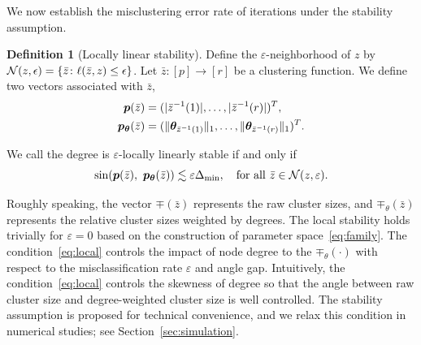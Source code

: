 \documentclass[journal]{IEEEtran}
\theoremstyle{definition}
\theoremstyle{definition}
\newtheorem{defn}{Definition}
\begin{document}
We now establish the misclustering error rate of iterations under the stability assumption. 
\begin{defn}[Locally linear stability] \label{def:stable}
Define the $\varepsilon$-neighborhood of $z$ by $\mathcal{N}(z,\epsilon)=\{\bar z\colon \ell(\bar z, z)\leq \epsilon\}$. Let $\bar z\colon[p]\to [r]$ be a clustering function. We define two vectors associated with $\bar z$,
\begin{align}
    \bm{p}(\bar z) & =(|\bar z^{-1}(1)|, \ldots,|\bar z^{-1}(r)|)^T, \\
    \bm{p}_{\boldsymbol{\theta}}(\bar z)&=(\lVert\boldsymbol{\theta}_{\bar z^{-1}(1)}\rVert_1,\ldots,\lVert\boldsymbol{\theta}_{\bar z^{-1}(r)}\rVert_1)^T.
\end{align}

We call the degree is $\varepsilon$-locally linearly stable if and only if 
\begin{equation}\label{eq:local}
    \sin(\mp(\bar z),\ \mp_{\mtheta}(\bar z))\lesssim \varepsilon \Delta_{\min} ,\quad \text{for all } \bar z\in \tN(z, \varepsilon).
\end{equation}
\end{defn}

Roughly speaking, the vector $\mp(\bar z)$ represents the raw cluster sizes, and $\mp_{\theta}(\bar z)$ represents the relative cluster sizes weighted by degrees. 
The local stability holds trivially for $\varepsilon=0$ based on the construction of parameter space~\eqref{eq:family}. The condition~\eqref{eq:local} controls the impact of node degree to the $\mp_{\theta}(\cdot)$ with respect to the misclassification rate $\varepsilon$ and angle gap.  Intuitively, the condition~\eqref{eq:local} controls the skewness of degree so that the angle between raw cluster size and degree-weighted cluster size is well controlled. The stability assumption is proposed for technical convenience, and we relax this condition in numerical studies; see Section~\ref{sec:simulation}.
\end{document}
